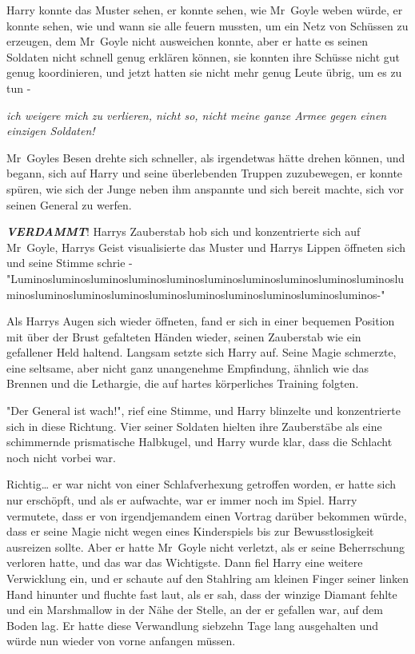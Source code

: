 {Harry konnte das Muster sehen, er konnte sehen, wie Mr~Goyle weben würde, er konnte sehen, wie und wann sie alle feuern mussten, um ein Netz von Schüssen zu erzeugen, dem Mr~Goyle nicht ausweichen konnte, aber er hatte es seinen Soldaten nicht schnell genug erklären können, sie konnten ihre Schüsse nicht gut genug koordinieren, und jetzt hatten sie nicht mehr genug Leute übrig, um es zu tun -

\emph{ich weigere mich zu verlieren, nicht so, nicht meine ganze Armee gegen einen einzigen Soldaten!}

Mr~Goyles Besen drehte sich schneller, als irgendetwas hätte drehen können, und begann, sich auf Harry und seine überlebenden Truppen zuzubewegen, er konnte spüren, wie sich der Junge neben ihm anspannte und sich bereit machte, sich vor seinen General zu werfen.

\textbf{\emph{VERDAMMT}}! Harrys Zauberstab hob sich und konzentrierte sich auf Mr~Goyle, Harrys Geist visualisierte das Muster und Harrys Lippen öffneten sich und seine Stimme schrie - "Luminosluminosluminosluminosluminosluminosluminosluminosluminosluminosluminosluminosluminosluminosluminosluminosluminosluminosluminosluminos-"

Als Harrys Augen sich wieder öffneten, fand er sich in einer bequemen Position mit über der Brust gefalteten Händen wieder, seinen Zauberstab wie ein gefallener Held haltend. Langsam setzte sich Harry auf. Seine Magie schmerzte, eine seltsame, aber nicht ganz unangenehme Empfindung, ähnlich wie das Brennen und die Lethargie, die auf hartes körperliches Training folgten.

"Der General ist wach!", rief eine Stimme, und Harry blinzelte und konzentrierte sich in diese Richtung. Vier seiner Soldaten hielten ihre Zauberstäbe als eine schimmernde prismatische Halbkugel, und Harry wurde klar, dass die Schlacht noch nicht vorbei war.

Richtig… er war nicht von einer Schlafverhexung getroffen worden, er hatte sich nur erschöpft, und als er aufwachte, war er immer noch im Spiel. Harry vermutete, dass er von irgendjemandem einen Vortrag darüber bekommen würde, dass er seine Magie nicht wegen eines Kinderspiels bis zur Bewusstlosigkeit ausreizen sollte. Aber er hatte Mr~Goyle nicht verletzt, als er seine Beherrschung verloren hatte, und das war das Wichtigste. Dann fiel Harry eine weitere Verwicklung ein, und er schaute auf den Stahlring am kleinen Finger seiner linken Hand hinunter und fluchte fast laut, als er sah, dass der winzige Diamant fehlte und ein Marshmallow in der Nähe der Stelle, an der er gefallen war, auf dem Boden lag. Er hatte diese Verwandlung siebzehn Tage lang ausgehalten und würde nun wieder von vorne anfangen müssen.

}
